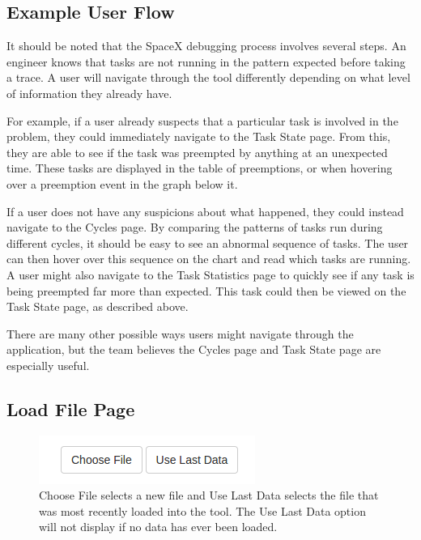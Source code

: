 \documentclass{hmcclinic}
\begin{document}
\subsection{Example User Flow}
  It should be noted that the SpaceX debugging process involves several steps. 
  An engineer knows that tasks are not running in the
  pattern expected before taking a trace. A user will navigate through the tool
  differently depending on what level of information they already have.

  For example, if a user already suspects that a particular task is involved
  in the problem, they could immediately navigate to the Task State page. From
  this, they are able to see if the task was preempted by anything
  at an unexpected time. These tasks are displayed in the table of
  preemptions, or when hovering over a preemption event in the graph below it.

  If a user does not have any suspicions about what happened, they could instead
  navigate to the Cycles page. By comparing the patterns of tasks run during
  different cycles, it should be easy to see an abnormal sequence of tasks. The
  user can then hover over this sequence on the chart and read which tasks are
  running. A user might also navigate to the Task Statistics page to quickly see
  if any task is being preempted far more than expected. This task could then be
  viewed on the Task State page, as described above.

  There are many other possible ways users might navigate through the
  application, but the team believes the Cycles page and Task State page 
are especially useful.


\subsection{Load File Page}

\begin{figure}[H]
  \centering
      \includegraphics[scale=0.75]{loadFile-buttons.png}
  \caption{Choose File selects a new file and Use Last Data selects the file
  that was most recently loaded into the tool. The Use Last Data option will not
display if no data has ever been loaded.}
  \end{figure}
\end{document}
